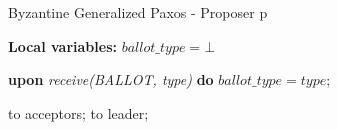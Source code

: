 
\begin{algorithm} 
	\caption{Byzantine Generalized Paxos - Proposer p}
	\label{BFT-Prop}
	\textbf{Local variables:} $ballot\_type = \bot$
	\begin{algorithmic}[1]
			
		\State \textbf{upon} \textit{receive(BALLOT, type)} \textbf{do} 
		\State \hspace{\algorithmicindent} $ballot\_type = type$;
		\State
		
		\State {} to acceptors;
		\Else
		\State {} to leader;
		\EndIf
		\EndFunction
		
	\end{algorithmic}
\end{algorithm}

